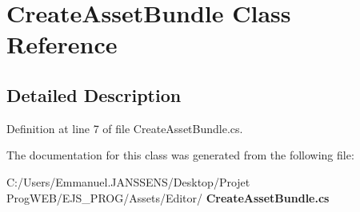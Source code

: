 \section{Create\+Asset\+Bundle Class Reference}
\label{class_create_asset_bundle}


\subsection{Detailed Description}


Definition at line 7 of file Create\+Asset\+Bundle.\+cs.



The documentation for this class was generated from the following file\+:\begin{DoxyCompactItemize}
\item 
C\+:/\+Users/\+Emmanuel.\+J\+A\+N\+S\+S\+E\+N\+S/\+Desktop/\+Projet Prog\+W\+E\+B/\+E\+J\+S\+\_\+\+P\+R\+O\+G/\+Assets/\+Editor/\textbf{ Create\+Asset\+Bundle.\+cs}\end{DoxyCompactItemize}
